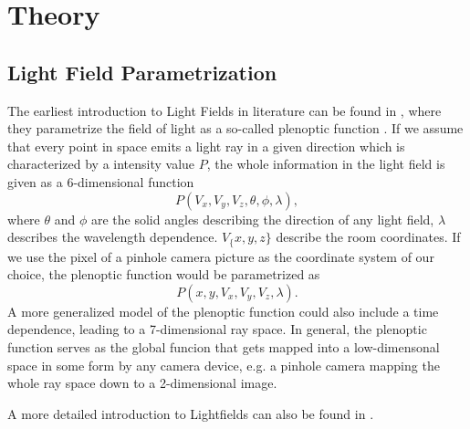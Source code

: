 \documentclass  [
  paper    = a4,
  BCOR     = 10mm,
  twoside,
  fontsize = 12pt,
  fleqn,
  toc      = bibnumbered,
  toc      = listofnumbered,
  numbers  = noendperiod,
  headings = normal,
  listof   = leveldown,
  version  = 3.03
]                                       {scrreprt}
\begin{document}
  

  \tableofcontents
\chapter{Theory}
\section{Light Field Parametrization}
The earliest introduction to Light Fields in literature can be found in \cite{adelson1991plenoptic}, where they parametrize the field of light as a  so-called \glqq plenoptic function \grqq. If we assume that every point in space emits a light ray  in a given direction which is characterized by a intensity value $P$, the whole information in the light field is given as a 6-dimensional function
\begin{equation}\label{key}
P(V_x,V_y, V_z, \theta, \phi, \lambda),
\end{equation}
where $\theta$ and $\phi$ are the solid angles describing the direction of any light field, $\lambda$ describes the wavelength dependence. $V_\{x,y,z\}$ describe the room coordinates. If we use the pixel of a pinhole camera picture as the coordinate system of our choice, the plenoptic function would be parametrized as 
\begin{equation}\label{eq:plenoptic}
P(x,y, V_x, V_y, V_z, \lambda).
\end{equation}
 A more generalized model of the plenoptic function could also include a time dependence, leading to a 7-dimensional ray space. In general, the plenoptic function serves as the global funcion that gets mapped into a low-dimensonal space in some form by any camera device, e.g. a pinhole camera mapping the whole ray space down to a 2-dimensional image.\\
 	
 A more detailed introduction to Lightfields can also be found in \cite{wanner2014orientation}. 
\end{document}

